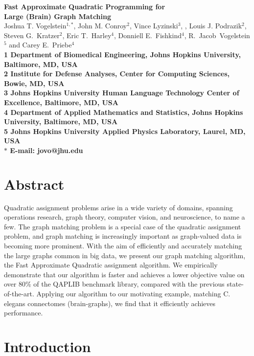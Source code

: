 \documentclass[10pt]{article}
\date{}
\begin{document}
\begin{flushleft}
{\Large
\textbf{Fast Approximate Quadratic Programming for\\ Large (Brain) Graph Matching}
}
\\
Joshua T. Vogelstein$^{1,\ast}$, John M. Conroy$^{2}$, Vince Lyzinski$^{3}$,
, Louis J. Podrazik$^{2}$,  Steven G.~Kratzer$^{2}$, Eric T.~Harley$^{4}$,
Donniell E.~Fishkind$^{4}$, 
		R.~Jacob~Vogelstein$^{5}$
        and Carey E.~Priebe$^{4}$
\\        
\bf{1} Department of Biomedical Engineering, Johns Hopkins University, Baltimore, MD, USA
\\
\bf{2} Institute for Defense Analyses, Center for Computing Sciences, Bowie, MD, USA
\\
\bf{3} Johns Hopkins University Human Language Technology Center of Excellence, Baltimore, MD, USA
\\
\bf{4} Department of Applied Mathematics and Statistics, Johns Hopkins University, Baltimore, MD, USA
\\
\bf{5}  Johns Hopkins University Applied Physics Laboratory, Laurel, MD, USA
\\
$\ast$ E-mail: jovo@jhu.edu
\end{flushleft}

 
\section*{Abstract}
Quadratic assignment problems arise in a wide variety of domains, spanning operations research, graph theory, computer vision, and neuroscience, to name a few.  The graph matching problem is a special case of the quadratic assignment problem,
and graph matching is increasingly important as
graph-valued data is becoming more prominent.  With the aim of efficiently and accurately matching the large graphs common in big data,
we present our graph matching algorithm, the Fast Approximate Quadratic assignment algorithm. 
We empirically demonstrate that our algorithm is faster and achieves a lower objective value on over $80\%$ of the QAPLIB benchmark library, compared with the previous state-of-the-art.  Applying our algorithm to our motivating example, matching C. elegans connectomes (brain-graphs), we find that it efficiently achieves  performance.


\section{Introduction}
\end{document}
